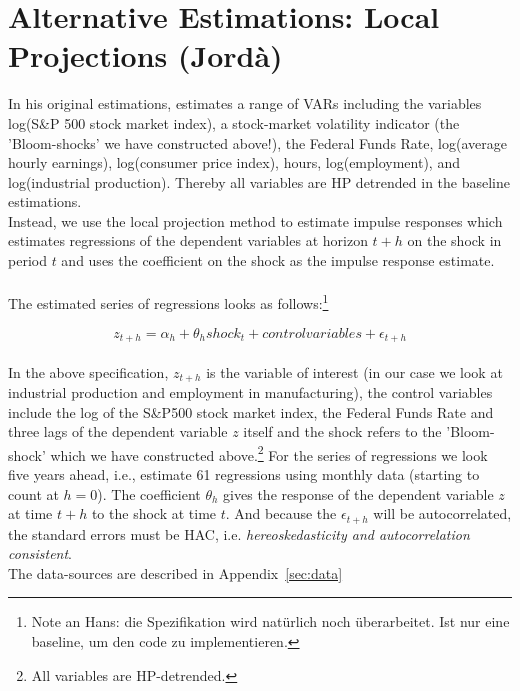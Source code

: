 \documentclass[a4paper,12pt,oneside,pointednumbers,bibtotoc,bigheadings,liststotoc]{scrbook}
\begin{document}
\section{Alternative Estimations: Local Projections (Jordà)}
In his original estimations, \citet{bloom:09} estimates a range of VARs including the variables log(S\&P 500 stock market index), a stock-market volatility indicator (the 'Bloom-shocks' we have constructed above!), the Federal Funds Rate, log(average hourly earnings), log(consumer price index), hours, log(employment), and log(industrial production). Thereby all variables are HP detrended in the baseline estimations.\\
Instead, we use the \citet{jorda:05} local projection method to estimate impulse responses which estimates regressions of the dependent variables at horizon $t+h$ on the shock in period $t$ and uses the coefficient on the shock as the impulse response estimate.
\\
\\
The estimated series of regressions looks as follows:\footnote{Note an Hans: die Spezifikation wird natürlich noch überarbeitet. Ist nur eine baseline, um den code zu implementieren.}

\begin{equation} \label{eq:2.1}
z_{t+h} = \alpha_h + \theta_h shock_t + control variables + \epsilon_{t+h}
\end{equation}\\

In the above specification, $z_{t+h}$ is the variable of interest (in our case we look at industrial production and employment in manufacturing), the control variables include the log of the S\&P500 stock market index, the Federal Funds Rate and three lags of the dependent variable $z$ itself and the shock refers to the 'Bloom-shock' which we have constructed above.\footnote{All variables are HP-detrended.} For the series of regressions we look five years ahead, i.e., estimate 61 regressions using monthly data (starting to count at $h=0$). The coefficient $\theta_h$ gives the response of the dependent variable $z$ at time $t+h$ to the shock at time $t$. And because the $\epsilon_{t+h}$ will be autocorrelated, the standard errors must be HAC, i.e. \textit{hereoskedasticity and autocorrelation consistent}.\\
The data-sources are described in Appendix~\ref{sec:data}
\end{document}

